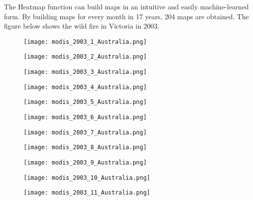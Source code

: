 \documentclass[
]{article}
\begin{document}
The Heatmap function can build maps in an intuitive and easily
machine-learned form. By building maps for every month in 17 years, 204
maps are obtained. The figure below shows the wild fire in Victoria in
2003.

\begin{figure}
\centering
\texttt{[image: modis\_2003\_1\_Australia.png]}
\caption{}
\end{figure}

\begin{figure}
\centering
\texttt{[image: modis\_2003\_2\_Australia.png]}
\caption{}
\end{figure}

\begin{figure}
\centering
\texttt{[image: modis\_2003\_3\_Australia.png]}
\caption{}
\end{figure}

\begin{figure}
\centering
\texttt{[image: modis\_2003\_4\_Australia.png]}
\caption{}
\end{figure}

\begin{figure}
\centering
\texttt{[image: modis\_2003\_5\_Australia.png]}
\caption{}
\end{figure}

\begin{figure}
\centering
\texttt{[image: modis\_2003\_6\_Australia.png]}
\caption{}
\end{figure}

\begin{figure}
\centering
\texttt{[image: modis\_2003\_7\_Australia.png]}
\caption{}
\end{figure}

\begin{figure}
\centering
\texttt{[image: modis\_2003\_8\_Australia.png]}
\caption{}
\end{figure}

\begin{figure}
\centering
\texttt{[image: modis\_2003\_9\_Australia.png]}
\caption{}
\end{figure}

\begin{figure}
\centering
\texttt{[image: modis\_2003\_10\_Australia.png]}
\caption{}
\end{figure}

\begin{figure}
\centering
\texttt{[image: modis\_2003\_11\_Australia.png]}
\caption{}
\end{figure}
\end{document}
